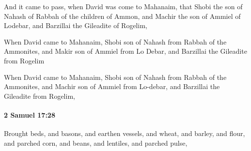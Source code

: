 			\begin{versebox}
					\item[BHS] 
					\item[ASV] And it came to pass, when David was come to Mahanaim, that Shobi the son of Nahash of Rabbah of the children of Ammon, and Machir the son of Ammiel of Lodebar, and Barzillai the Gileadite of Rogelim,
					\item[NIV] When David came to Mahanaim, Shobi son of Nahash from Rabbah of the Ammonites, and Makir son of Ammiel from Lo Debar, and Barzillai the Gileadite from Rogelim
					\item[NRSV] When David came to Mahanaim, Shobi son of Nahash from Rabbah of the Ammonites, and Machir son of Ammiel from Lo-debar, and Barzillai the Gileadite from Rogelim,
			\end{versebox}

		\paragraph{2 Samuel 17:28} %
			\label{2SAMUEL-17-28}

			Brought beds, and basons, and earthen vessels, and wheat, and barley, and flour, and parched corn, and beans, and lentiles, and parched pulse,

